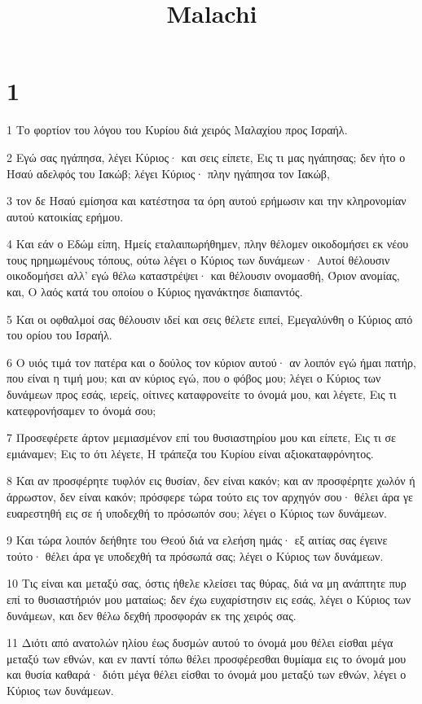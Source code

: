 

\title{Malachi}


\chapter{1}

\par 1 Το φορτίον του λόγου του Κυρίου διά χειρός Μαλαχίου προς Ισραήλ.
\par 2 Εγώ σας ηγάπησα, λέγει Κύριος· και σεις είπετε, Εις τι μας ηγάπησας; δεν ήτο ο Ησαύ αδελφός του Ιακώβ; λέγει Κύριος· πλην ηγάπησα τον Ιακώβ,
\par 3 τον δε Ησαύ εμίσησα και κατέστησα τα όρη αυτού ερήμωσιν και την κληρονομίαν αυτού κατοικίας ερήμου.
\par 4 Και εάν ο Εδώμ είπη, Ημείς εταλαιπωρήθημεν, πλην θέλομεν οικοδομήσει εκ νέου τους ηρημωμένους τόπους, ούτω λέγει ο Κύριος των δυνάμεων· Αυτοί θέλουσιν οικοδομήσει αλλ' εγώ θέλω καταστρέψει· και θέλουσιν ονομασθή, Όριον ανομίας, και, Ο λαός κατά του οποίου ο Κύριος ηγανάκτησε διαπαντός.
\par 5 Και οι οφθαλμοί σας θέλουσιν ιδεί και σεις θέλετε ειπεί, Εμεγαλύνθη ο Κύριος από του ορίου του Ισραήλ.
\par 6 Ο υιός τιμά τον πατέρα και ο δούλος τον κύριον αυτού· αν λοιπόν εγώ ήμαι πατήρ, που είναι η τιμή μου; και αν κύριος εγώ, που ο φόβος μου; λέγει ο Κύριος των δυνάμεων προς εσάς, ιερείς, οίτινες καταφρονείτε το όνομά μου, και λέγετε, Εις τι κατεφρονήσαμεν το όνομά σου;
\par 7 Προσεφέρετε άρτον μεμιασμένον επί του θυσιαστηρίου μου και είπετε, Εις τι σε εμιάναμεν; Εις το ότι λέγετε, Η τράπεζα του Κυρίου είναι αξιοκαταφρόνητος.
\par 8 Και αν προσφέρητε τυφλόν εις θυσίαν, δεν είναι κακόν; και αν προσφέρητε χωλόν ή άρρωστον, δεν είναι κακόν; πρόσφερε τώρα τούτο εις τον αρχηγόν σου· θέλει άρα γε ευαρεστηθή εις σε ή υποδεχθή το πρόσωπόν σου; λέγει ο Κύριος των δυνάμεων.
\par 9 Και τώρα λοιπόν δεήθητε του Θεού διά να ελεήση ημάς· εξ αιτίας σας έγεινε τούτο· θέλει άρα γε υποδεχθή τα πρόσωπά σας; λέγει ο Κύριος των δυνάμεων.
\par 10 Τις είναι και μεταξύ σας, όστις ήθελε κλείσει τας θύρας, διά να μη ανάπτητε πυρ επί το θυσιαστήριόν μου ματαίως; δεν έχω ευχαρίστησιν εις εσάς, λέγει ο Κύριος των δυνάμεων, και δεν θέλω δεχθή προσφοράν εκ της χειρός σας.
\par 11 Διότι από ανατολών ηλίου έως δυσμών αυτού το όνομά μου θέλει είσθαι μέγα μεταξύ των εθνών, και εν παντί τόπω θέλει προσφέρεσθαι θυμίαμα εις το όνομά μου και θυσία καθαρά· διότι μέγα θέλει είσθαι το όνομά μου μεταξύ των εθνών, λέγει ο Κύριος των δυνάμεων.
